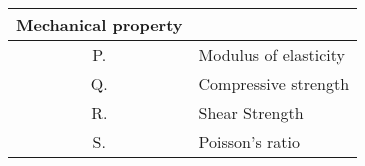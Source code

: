 \begin{tabular}[12pt]{ |c|l| }
\hline
\textbf{Mechanical property} & \\ \hline
P. & Modulus of elasticity \\ \hline
Q. & Compressive strength \\ \hline
R. & Shear Strength \\ \hline
S. & Poisson’s ratio \\ \hline
\end{tabular}
